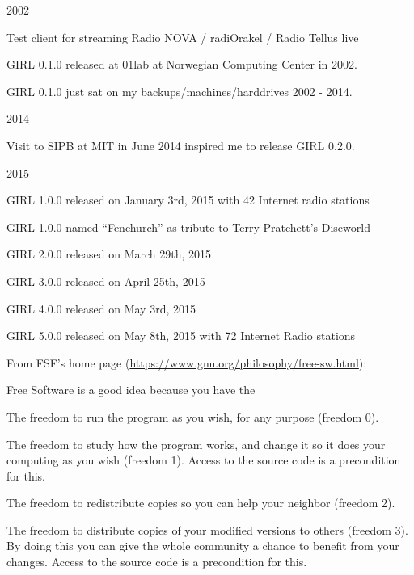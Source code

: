 \documentclass[20pt,landscape]{foils}
\begin{document}

\begin{list1}
\item 2002
  \begin{list2}
  \item Test client for streaming Radio NOVA / radiOrakel / Radio Tellus live
  \item GIRL 0.1.0 released at 01lab at Norwegian Computing Center in 2002.
  \item GIRL 0.1.0 just sat on my backups/machines/harddrives 2002 - 2014.
  \end{list2}
\item 2014
  \begin{list2}
  \item Visit to SIPB at MIT in June 2014 inspired me to release GIRL 0.2.0.
  \end{list2}
\item 2015
  \begin{list2}
    \item GIRL 1.0.0 released on January 3rd, 2015 with 42 Internet radio stations
    \item GIRL 1.0.0 named ``Fenchurch'' as tribute to Terry Pratchett's Discworld
    \item GIRL 2.0.0 released on March 29th, 2015
    \item GIRL 3.0.0 released on April 25th, 2015
    \item GIRL 4.0.0 released on May 3rd, 2015
    \item GIRL 5.0.0 released on May 8th, 2015 with 72 Internet Radio stations
  \end{list2}
\end{list1}


From FSF's home page (\url{https://www.gnu.org/philosophy/free-sw.html}):

\begin{list1}
\item Free Software is a good idea because you have the
  \begin{list2}
    \item The freedom to run the program as you wish, for any purpose (freedom 0).
    \item The freedom to study how the program works, and change it so it does your computing as you wish (freedom 1). Access to the source code is a precondition for this.
    \item The freedom to redistribute copies so you can help your neighbor (freedom 2).
    \item The freedom to distribute copies of your modified versions to others (freedom 3). By doing this you can give the whole community a chance to benefit from your changes. Access to the source code is a precondition for this.
  \end{list2}
\end{list1}
\end{document}

